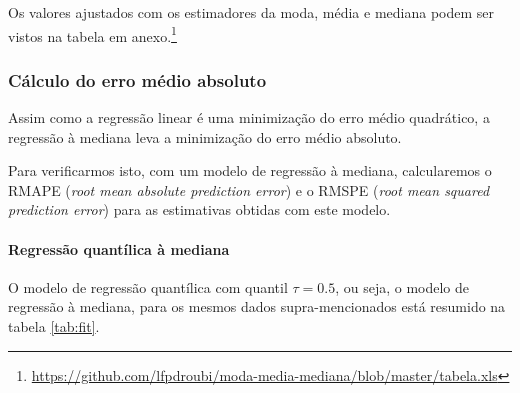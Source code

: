 \documentclass[a4paper, 12pt]{article}
\let\oldparagraph\paragraph
\renewcommand{\paragraph}[1]{\oldparagraph{#1}\mbox{}}
\let\rmarkdownfootnote\footnote%
\def\footnote{\protect\rmarkdownfootnote}
\begin{document}
Os valores ajustados com os estimadores da moda, média e mediana podem
ser vistos na tabela em anexo.\footnote{\url{https://github.com/lfpdroubi/moda-media-mediana/blob/master/tabela.xls}}

\subsubsection{Cálculo do erro médio
absoluto}\label{calculo-do-erro-medio-absoluto}

Assim como a regressão linear é uma minimização do erro médio
quadrático, a regressão à mediana leva a minimização do erro médio
absoluto.

Para verificarmos isto, com um modelo de regressão à mediana,
calcularemos o RMAPE (\emph{root mean absolute prediction error}) e o
RMSPE (\emph{root mean squared prediction error}) para as estimativas
obtidas com este modelo.

\paragraph{Regressão quantílica à
mediana}\label{regressao-quantilica-a-mediana}

O modelo de regressão quantílica com quantil \(\tau = 0.5\), ou seja, o
modelo de regressão à mediana, para os mesmos dados supra-mencionados
está resumido na tabela \ref{tab:fit}.
\end{document}

